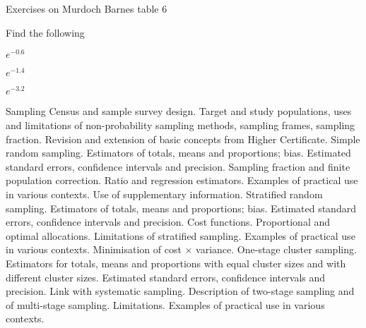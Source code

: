 \documentclass{beamer}
\begin{document}
\begin{frame}
	
	Exercises on Murdoch Barnes table 6
	
	Find the following
	
	$e^{-0.6}$
	
	$e^{-1.4}$
	
	$e^{-3.2}$
	
\end{frame}
Sampling
Census and sample survey design. Target and study populations, uses and limitations of non-probability sampling methods, sampling frames, sampling fraction.
Revision and extension of basic concepts from Higher Certificate.
Simple random sampling. Estimators of totals, means and proportions; bias. Estimated standard errors, confidence intervals and precision. Sampling fraction and finite population correction. Ratio and regression estimators.
Examples of practical use in various contexts.
Use of supplementary information.
Stratified random sampling. Estimators of totals, means and proportions; bias. Estimated standard errors, confidence intervals and precision. Cost functions. Proportional and optimal allocations. Limitations of stratified sampling.
Examples of practical use in various contexts.
Minimisation of cost × variance.
One-stage cluster sampling. Estimators for totals, means and proportions with equal cluster sizes and with different cluster sizes. Estimated standard errors, confidence intervals and precision. Link with systematic sampling. Description of two-stage sampling and of multi-stage sampling. Limitations.
Examples of practical use in various contexts.
\end{document}
